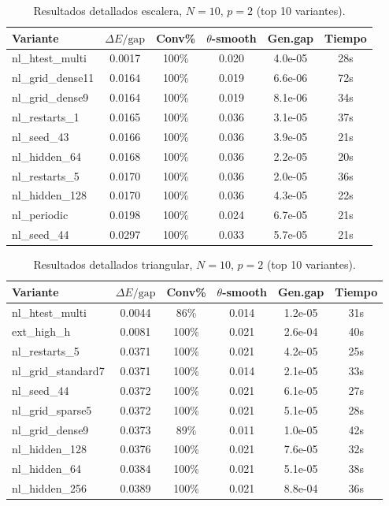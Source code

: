 \documentclass[11pt,a4paper,spanish]{book}
\begin{document}
\begin{table}[h]
\centering
\caption{Resultados detallados escalera, $N = 10$, $p = 2$ (top 10 variantes).}
\label{tab:app_ladder}
\begin{tabular}{lccccc}
\toprule
\textbf{Variante} & \textbf{$\Delta E/\text{gap}$} & \textbf{Conv\%} & \textbf{$\theta$-smooth} & \textbf{Gen.gap} & \textbf{Tiempo} \\
\midrule
nl\_htest\_multi & 0.0017 & 100\% & 0.020 & 4.0e-05 & 28s \\
nl\_grid\_dense11 & 0.0164 & 100\% & 0.019 & 6.6e-06 & 72s \\
nl\_grid\_dense9 & 0.0164 & 100\% & 0.019 & 8.1e-06 & 34s \\
nl\_restarts\_1 & 0.0165 & 100\% & 0.036 & 3.1e-05 & 37s \\
nl\_seed\_43 & 0.0166 & 100\% & 0.036 & 3.9e-05 & 21s \\
nl\_hidden\_64 & 0.0168 & 100\% & 0.036 & 2.2e-05 & 20s \\
nl\_restarts\_5 & 0.0170 & 100\% & 0.036 & 2.0e-05 & 36s \\
nl\_hidden\_128 & 0.0170 & 100\% & 0.036 & 4.3e-05 & 22s \\
nl\_periodic & 0.0198 & 100\% & 0.024 & 6.7e-05 & 21s \\
nl\_seed\_44 & 0.0297 & 100\% & 0.033 & 5.7e-05 & 21s \\
\bottomrule
\end{tabular}
\end{table}

\begin{table}[h]
\centering
\caption{Resultados detallados triangular, $N = 10$, $p = 2$ (top 10 variantes).}
\label{tab:app_tri}
\begin{tabular}{lccccc}
\toprule
\textbf{Variante} & \textbf{$\Delta E/\text{gap}$} & \textbf{Conv\%} & \textbf{$\theta$-smooth} & \textbf{Gen.gap} & \textbf{Tiempo} \\
\midrule
nl\_htest\_multi & 0.0044 & 86\% & 0.014 & 1.2e-05 & 31s \\
ext\_high\_h & 0.0081 & 100\% & 0.021 & 2.6e-04 & 40s \\
nl\_restarts\_5 & 0.0371 & 100\% & 0.021 & 4.2e-05 & 25s \\
nl\_grid\_standard7 & 0.0371 & 100\% & 0.014 & 2.1e-05 & 33s \\
nl\_seed\_44 & 0.0372 & 100\% & 0.021 & 6.1e-05 & 27s \\
nl\_grid\_sparse5 & 0.0372 & 100\% & 0.021 & 5.1e-05 & 28s \\
nl\_grid\_dense9 & 0.0373 & 89\% & 0.011 & 1.0e-05 & 42s \\
nl\_hidden\_128 & 0.0376 & 100\% & 0.021 & 7.6e-05 & 32s \\
nl\_hidden\_64 & 0.0384 & 100\% & 0.021 & 5.1e-05 & 38s \\
nl\_hidden\_256 & 0.0389 & 100\% & 0.021 & 8.8e-04 & 36s \\
\bottomrule
\end{tabular}
\end{table}
\end{document}

